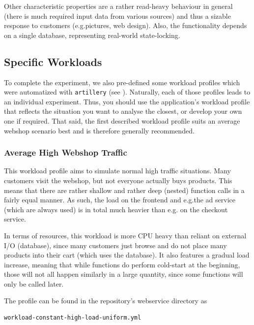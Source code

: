 \documentclass[../main.tex]{subfiles}
\begin{document}
Other characteristic properties are a rather read-heavy behaviour in general 
(there is much required input data from various sources) 
and thus a sizable response to customers (e.g.\@ pictures, web design). 
Also, the functionality depends on a single database, representing real-world state-locking.


\subsection{Specific Workloads}\label{ssec:webshopSpecificWorkloads}

To complete the experiment, we also pre-defined some workload profiles which were automatized with \texttt{artillery}
(see ).
Naturally, each of those profiles leads to an individual experiment.
Thus, you should use the application's workload profile that reflects the situation you want to analyse the closest,
or develop your own one if required.
That said, the first described workload profile suits an average webshop scenario best and is therefore generally recommended.

\subsubsection{Average High Webshop Traffic}%
\label{ssub:webshopProfileHighTraffic}

This workload profile aims to simulate normal high traffic situations.
Many customers visit the webshop, but not everyone actually buys products.
This means that there are rather shallow and rather deep (nested) function calls in a fairly equal manner.
As such, the load on the frontend and e.g.\@ the ad service (which are always used) is in total much heavier than e.g.\@ 
on the checkout service.

In terms of resources, this workload is more CPU heavy than reliant on external I/O (database),
since many customers just browse and do not place many products into their cart (which uses the database).
It also features a gradual load increase, meaning that while functions do perform cold-start at the beginning,
those will not all happen similarly in a large quantity, since some functions will only be called later.

The profile can be found in the repository's webservice directory as 
\begin{tcolorbox}
\quad\texttt{workload-constant-high-load-uniform.yml}
\end{tcolorbox}
\end{document}
